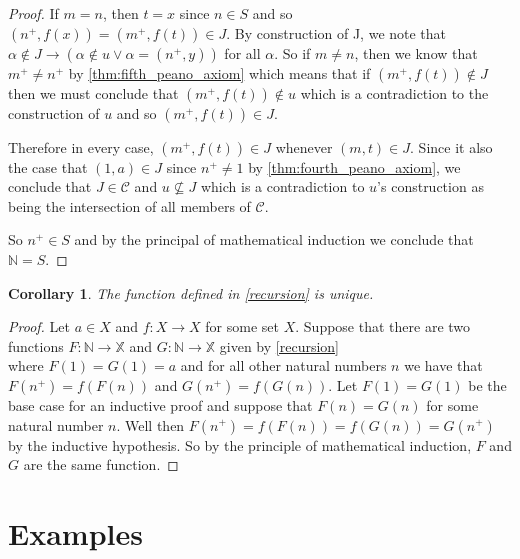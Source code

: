 \documentclass{article}
\theoremstyle{definition}
\theoremstyle{definition}
\theoremstyle{plain}
\theoremstyle{remark}
\theoremstyle{plain}
\theoremstyle{remark}
\theoremstyle{plain}
\theoremstyle{plain}
\theoremstyle{plain}
\theoremstyle{plain}
\newtheorem{corollary}{Corollary}[section]
\begin{document}
\begin{proof}
If \( m = n \), then \( t = x \) since \( n \in S \) and so 
\( (n^{+}, f(x)) = (m^{+},f(t)) \in J \). By construction of J, we note that 
\( \alpha \not\in J \rightarrow (\alpha \not\in u \lor \alpha = (n^{+},y))\) 
for all \( \alpha \). 
So if \( m \neq n \), then we know that \( m^{+} \neq n^{+} \) by  
\autoref{thm:fifth_peano_axiom} which means that if 
\( (m^{+}, f(t)) \not\in J \) 
then we must conclude that \( (m^{+}, f(t)) \not\in u \) which is a 
contradiction to the construction of \( u \) and so \( (m^{+}, f(t)) \in J \). 

Therefore in every case, \( (m^{+},f(t)) \in J \)
whenever \((m,t) \in J \). Since it also the case that \((1,a) \in J \) since 
\( n^{+} \neq 1 \) by \autoref{thm:fourth_peano_axiom}, we conclude that 
\(J \in \mathcal{C} \) and \( u \not\subseteq J \) which is a contradiction to 
\( u \)'s construction as being the intersection of all members of 
\( \mathcal{C} \). 

So \( n^{+} \in S \) and by the principal of mathematical induction we conclude 
that \( \mathbb{N}  = S \). 
\end{proof}

\begin{corollary}
  The function defined in \autoref{recursion} is unique.
  \label{thm:recursion_uniqueness}
\end{corollary}

\begin{proof}
  Let \( a \in X \) and \( f: X \rightarrow X \) for some set \( X \). Suppose 
  that there are two functions 
  \( F: \mathbb{N} \rightarrow \mathbb{X}  \) and 
  \( G: \mathbb{N} \rightarrow \mathbb{X} \) given by \autoref{recursion} \\
  where \( F(1) = G(1) = a \) and for all other natural numbers \( n \) we have
  that 
  \( F(n^{+}) = f(F(n)) \) and \( G(n^+) = f(G(n)) \). 
  Let \( F(1) = G(1) \) be the base case for an inductive 
  proof and suppose that \( F(n) = G(n) \) for some natural number \( n \). 
  Well then \( F(n^{+}) = f(F(n)) = f(G(n)) = G(n^{+}) \) by the inductive 
  hypothesis. So by the principle 
  of mathematical induction, \( F \) and \( G \) are the same function.
\end{proof}

\newpage

\section{Examples}
\end{document}
